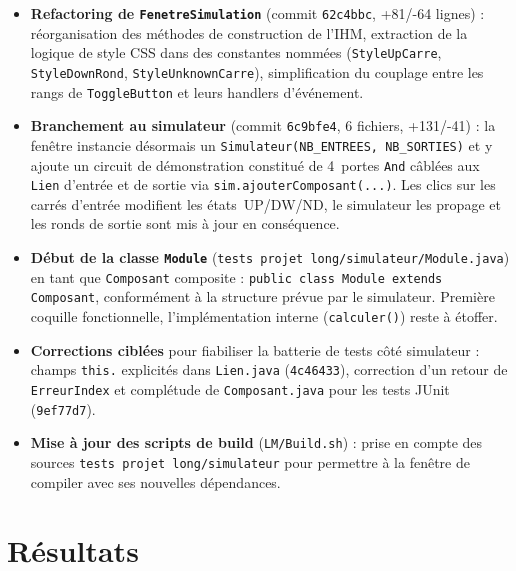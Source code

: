 \documentclass[11pt,a4paper]{article}
\begin{document}
\begin{itemize}
  \item \textbf{Refactoring de \texttt{FenetreSimulation}} (commit \texttt{62c4bbc}, +81/-64 lignes) : r\'eorganisation des m\'ethodes de construction de l'IHM, extraction de la logique de style CSS dans des constantes nomm\'ees (\texttt{StyleUpCarre}, \texttt{StyleDownRond}, \texttt{StyleUnknown\-Carre}), simplification du couplage entre les rangs de \texttt{ToggleButton} et leurs handlers d'\'ev\'enement.
  \item \textbf{Branchement au simulateur} (commit \texttt{6c9bfe4}, 6 fichiers, +131/-41) : la fen\^etre instancie d\'esormais un \texttt{Simulateur(NB\_ENTREES, NB\_SORTIES)} et y ajoute un circuit de d\'emonstration constitu\'e de 4~portes \texttt{And} c\^abl\'ees aux \texttt{Lien} d'entr\'ee et de sortie via \texttt{sim.ajouter\-Composant(...)}. Les clics sur les carr\'es d'entr\'ee modifient les \'etats~UP/DW/ND, le simulateur les propage et les ronds de sortie sont mis \`a jour en cons\'equence.
  \item \textbf{D\'ebut de la classe \texttt{Module}} (\texttt{tests projet long/simulateur/Module.java}) en tant que \texttt{Composant} composite : \texttt{public class Module extends Composant}, conform\'ement \`a la structure pr\'evue par le simulateur. Premi\`ere coquille fonctionnelle, l'impl\'ementation interne (\texttt{calculer()}) reste \`a \'etoffer.
  \item \textbf{Corrections cibl\'ees} pour fiabiliser la batterie de tests c\^ot\'e simulateur : champs \texttt{this.} expli\-cit\'es dans \texttt{Lien.java} (\texttt{4c46433}), correction d'un retour de \texttt{ErreurIndex} et compl\'etude de \texttt{Composant.java} pour les tests JUnit (\texttt{9ef77d7}).
  \item \textbf{Mise \`a jour des scripts de build} (\texttt{LM/Build.sh}) : prise en compte des sources \texttt{tests projet long/simulateur} pour permettre \`a la fen\^etre de compiler avec ses nouvelles d\'ependances.
\end{itemize}

\section*{R\'esultats}
\end{document}

